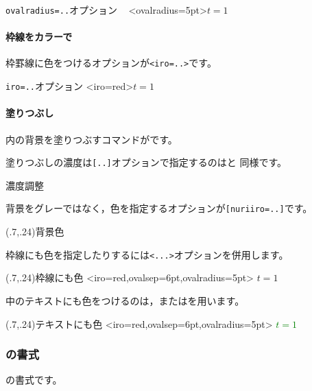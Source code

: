 \documentclass[a4j]{jarticle}
\begin{document}
\begin{showEx}{\texttt{ovalradius=..}オプション}
~
\psovalbox<ovalradius=5pt>{$t=1$}
\end{showEx}

\paragraph{枠線をカラーで}
枠罫線に色をつけるオプションが\verb+<iro=..>+です。

\begin{showEx}{\texttt{iro=..}オプション}
\psovalbox<iro=red>{$t=1$}
\end{showEx}

\paragraph{塗りつぶし}
内の背景を塗りつぶすコマンドがです。

\begin{showEx}{}
\end{showEx}

塗りつぶしの濃度は\verb+[..]+オプションで指定するのはと
同様です。

\begin{showEx}{濃度調整}
\end{showEx}

背景をグレーではなく，色を指定するオプションが\verb+[nuriiro=..]+です。

\begin{showEx}(.7,.24){背景色}
\end{showEx}

枠線にも色を指定したりするには\verb+<...>+オプションを併用します。

\begin{showEx}(.7,.24){枠線にも色}
\psovalbox*[nuriiro=yellow]%
  <iro=red,ovalsep=6pt,ovalradius=5pt>%
  {$t=1$}
\end{showEx}

中のテキストにも色をつけるのは，またはを用います。

\begin{showEx}(.7,.24){テキストにも色}
\psovalbox*[nuriiro=yellow]%
  <iro=red,ovalsep=6pt,ovalradius=5pt>%
  {\textcolor{green}{$t=1$}}%
\end{showEx}

\subsubsection{\texorpdfstring{}{psovalbox}の書式}
の書式です。
\end{document}
